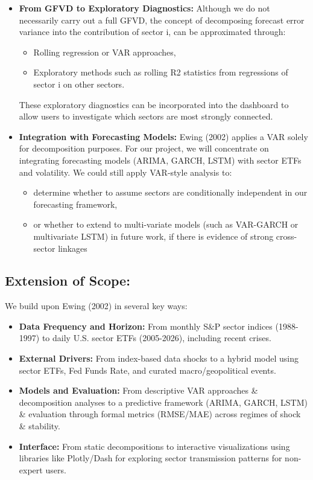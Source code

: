 \documentclass{article}
\begin{document}
\begin{itemize}
    \item \textbf{From GFVD to Exploratory Diagnostics:}  
    Although we do not necessarily carry out a full GFVD, the concept of decomposing forecast error variance into the contribution of sector i, can be approximated through:
    \begin{itemize}
        \item Rolling regression or VAR approaches,
        \item Exploratory methods such as rolling R2 statistics from regressions of sector i on other sectors.
    \end{itemize}
    These exploratory diagnostics can be incorporated into the dashboard to allow users to investigate which sectors are most strongly connected.

    \item \textbf{Integration with Forecasting Models:}  
    Ewing (2002) applies a VAR solely for decomposition purposes. For our project, we will concentrate on integrating forecasting models (ARIMA, GARCH, LSTM) with sector ETFs and volatility. We could still apply VAR-style analysis to:
    \begin{itemize}
        \item determine whether to assume sectors are conditionally independent in our forecasting framework,
        \item or whether to extend to multi-variate models (such as VAR-GARCH or multivariate LSTM) in future work, if there is evidence of strong cross-sector linkages
    \end{itemize}
\end{itemize}

\subsection{Extension of Scope:}  
We build upon Ewing (2002) in several key ways:

\begin{itemize}
    \item \textbf{Data Frequency and Horizon:} From monthly S\&P sector indices (1988-1997) to daily U.S. sector ETFs (2005-2026), including recent crises.
    \item \textbf{External Drivers:} From index-based data shocks to a hybrid model using sector ETFs, Fed Funds Rate, and curated macro/geopolitical events.
    \item \textbf{Models and Evaluation:} From descriptive VAR approaches \& decomposition analyses to a predictive framework (ARIMA, GARCH, LSTM) \& evaluation through formal metrics (RMSE/MAE) across regimes of shock \& stability.
    \item \textbf{Interface:} From static decompositions to interactive visualizations using libraries like Plotly/Dash for exploring sector transmission patterns for non-expert users.
\end{itemize}
\end{document}
